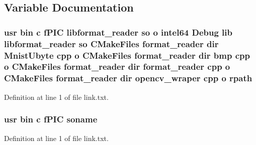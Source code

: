 \subsection{Variable Documentation}
\subsubsection[{\texorpdfstring{rpath}{rpath}}]{\setlength{\rightskip}{0pt plus 5cm}usr bin {\bf c} f\+P\+IC libformat\+\_\+reader {\bf so} o intel64 Debug lib libformat\+\_\+reader {\bf so} C\+Make\+Files format\+\_\+reader dir Mnist\+Ubyte cpp o C\+Make\+Files format\+\_\+reader dir bmp cpp o C\+Make\+Files format\+\_\+reader dir format\+\_\+reader cpp o C\+Make\+Files format\+\_\+reader dir opencv\+\_\+wraper cpp o rpath}\hypertarget{thirdparty_2common_2format__reader_2CMakeFiles_2format__reader_8dir_2link_8txt_a59765fadfe6614a969383e81277046b2}{}\label{thirdparty_2common_2format__reader_2CMakeFiles_2format__reader_8dir_2link_8txt_a59765fadfe6614a969383e81277046b2}


Definition at line 1 of file link.\+txt.

\subsubsection[{\texorpdfstring{soname}{soname}}]{\setlength{\rightskip}{0pt plus 5cm}usr bin {\bf c} f\+P\+IC soname}\hypertarget{thirdparty_2common_2format__reader_2CMakeFiles_2format__reader_8dir_2link_8txt_ab65a9b6457c4853ed17f89f945516e66}{}\label{thirdparty_2common_2format__reader_2CMakeFiles_2format__reader_8dir_2link_8txt_ab65a9b6457c4853ed17f89f945516e66}


Definition at line 1 of file link.\+txt.

